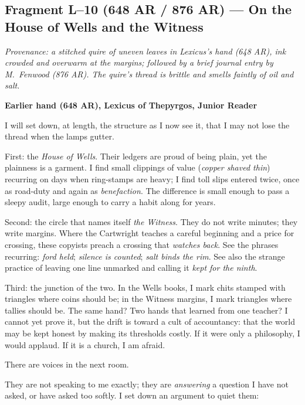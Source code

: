 \documentclass[11pt]{article}
\begin{document}
\subsection{Fragment L--10 (648 AR / 876 AR) --- On the House of Wells and the Witness}
\label{frag:l10}
{}

\noindent\textit{Provenance: a stitched quire of uneven leaves in Lexicus’s hand (648 AR), ink crowded and overwarm at the margins; followed by a brief journal entry by M.\ Fenwood (876 AR). The quire’s thread is brittle and smells faintly of oil and salt.}

\medskip
\noindent\textbf{Earlier hand (648 AR), Lexicus of Thepyrgos, Junior Reader}

I will set down, at length, the structure as I now see it, that I may not lose the thread when the lamps gutter.

First: the \textit{House of Wells}. Their ledgers are proud of being plain, yet the plainness is a garment. I find small clippings of value (\emph{copper shaved thin}) recurring on days when ring-stamps are heavy; I find toll slips entered twice, once as road-duty and again as \emph{benefaction}. The difference is small enough to pass a sleepy audit, large enough to carry a habit along for years.

Second: the circle that names itself \textit{the Witness}. They do not write minutes; they write margins. Where the Cartwright teaches a careful beginning and a price for crossing, these copyists preach a crossing that \emph{watches back}. See the phrases recurring: \emph{ford held}; \emph{silence is counted}; \emph{salt binds the rim}. See also the strange practice of leaving one line unmarked and calling it \emph{kept for the ninth}.

Third: the junction of the two. In the Wells books, I mark chits stamped with triangles where coins should be; in the Witness margins, I mark triangles where tallies should be. The same hand? Two hands that learned from one teacher? I cannot yet prove it, but the drift is toward a cult of accountancy: that the world may be kept honest by making its thresholds costly. If it were only a philosophy, I would applaud. If it is a church, I am afraid.

There are voices in the next room.

They are not speaking to me exactly; they are \emph{answering} a question I have not asked, or have asked too softly. I set down an argument to quiet them:
\end{document}
